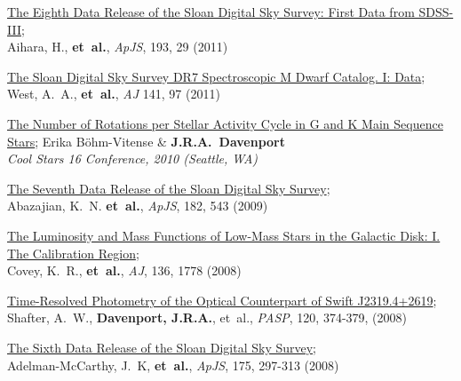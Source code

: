 \documentclass{article}
\begin{document}
\begin{llist}
\begin{etaremune}[leftmargin=10pt]
\item {\sc \href{http://adsabs.harvard.edu/abs/2011ApJS..193...29A}{\color{blue}The Eighth Data Release of the Sloan Digital Sky Survey: First Data from SDSS-III}};\\
Aihara, H., {\bf et~al.}, {\em ApJS}, 193, 29 (2011)


\item {\sc \href{http://adsabs.harvard.edu/abs/2011AJ....141...97W}{\color{blue}The Sloan Digital Sky Survey DR7 Spectroscopic M Dwarf Catalog. I: Data}};\\
West, A.~A., {\bf et~al.}, {\em AJ} 141, 97 (2011)

\item{\sc\href{http://adsabs.harvard.edu/abs/2011ASPC..448.1077B}{\color{blue}The Number of Rotations per Stellar Activity Cycle in G and K Main Sequence Stars}};
Erika B\"ohm-Vitense \& {\bf J.R.A.~Davenport}\\
{\em Cool Stars 16 Conference, 2010 (Seattle, WA)}

\item {\sc \href{http://adsabs.harvard.edu/abs/2009ApJS..182..543A}{\color{blue}The Seventh Data Release of the Sloan Digital Sky Survey}};\\
Abazajian, K.~N. {\bf et~al.}, {\em ApJS}, 182, 543 (2009)

\item {\sc \href{http://adsabs.harvard.edu/abs/2008AJ....136.1778C}{\color{blue}The Luminosity and Mass Functions of Low-Mass Stars in the Galactic Disk: I. The Calibration Region}};\\
Covey, K.~R., {\bf et~al.}, {\em AJ}, 136, 1778 (2008)

\item {\sc \href{http://adsabs.harvard.edu/abs/2008PASP..120..374S}{\color{blue}Time-Resolved Photometry of the Optical Counterpart of Swift J2319.4+2619}};\\
Shafter, A.~W., {\bf Davenport, J.R.A.}, et~al., {\em PASP}, 120, 374-379, (2008)

\item {\sc \href{http://adsabs.harvard.edu/abs/2008ApJS..175..297A}{\color{blue}The Sixth Data Release of the Sloan Digital Sky Survey}};\\
Adelman-McCarthy, J.~K, {\bf et~al.}, {\em ApJS}, 175, 297-313 (2008)
  
\end{etaremune}

\thispagestyle{empty}





\end{llist}
\end{document}
